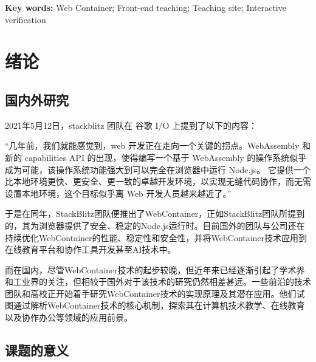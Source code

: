 \documentclass{HDU-Bachelor-Thesis}
\begin{document}
\vspace{\baselineskip}\noindent
\textbf{Key words:} Web Container; Front-end teaching; Teaching site; Interactive verification

\clearpage
\tableofcontents

\clearpage
\pagestyle{HDU-bachelor}

\section{绪论}

\subsection{国内外研究}

2021年5月12日，stackblitz 团队在 谷歌 I/O 上提到了以下的内容：

“几年前，我们就能感觉到，web 开发正在走向一个关键的拐点。WebAssembly 和新的 capabilities API 的出现，使得编写一个基于 WebAssembly 的操作系统似乎成为可能，该操作系统功能强大到可以完全在浏览器中运行 Node.js。 它提供一个比本地环境更快、更安全、更一致的卓越开发环境，以实现无缝代码协作，而无需设置本地环境，这个目标似乎离 Web 开发人员越来越近了。”

于是在同年，StackBlitz团队便推出了WebContainer，正如StackBlitz团队所提到的，其为浏览器提供了安全、稳定的Node.js运行时。目前国外的团队与公司还在持续优化WebContainer的性能、稳定性和安全性，并将WebContainer技术应用到在线教育平台和协作工具开发甚至AI技术中。

而在国内，尽管WebContainer技术的起步较晚，但近年来已经逐渐引起了学术界和工业界的关注，但相较于国外对于该技术的研究仍然相差甚远。一些前沿的技术团队和高校正开始着手研究WebContainer技术的实现原理及其潜在应用。他们试图通过解析WebContainer技术的核心机制，探索其在计算机技术教学、在线教育以及协作办公等领域的应用前景。


\subsection{课题的意义}
\end{document}
